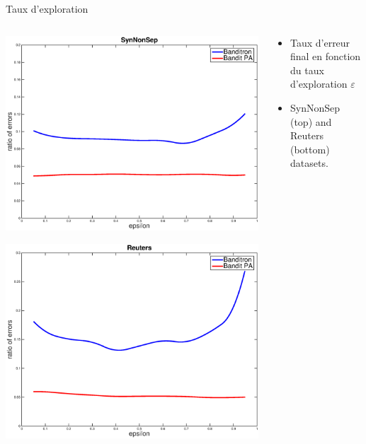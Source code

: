 \documentclass{beamer}
\begin{document}
\begin{frame}{Taux d'exploration}
		\begin{columns}
			\begin{column}{.5\linewidth}
				\centerline{\includegraphics[width=\linewidth]{figs/SynNonSep_gamma.eps}}
				\centerline{\includegraphics[width=\linewidth]{figs/Reuters_gamma.eps}}
			\end{column}
			\begin{column}{.5\linewidth}
				\begin{itemize}
					\item Taux d'erreur final en fonction du taux d'exploration $\varepsilon$
					\item SynNonSep (top) and Reuters (bottom) datasets.
				\end{itemize}
			\end{column}	
		\end{columns}
		

\end{frame}
\end{document}
